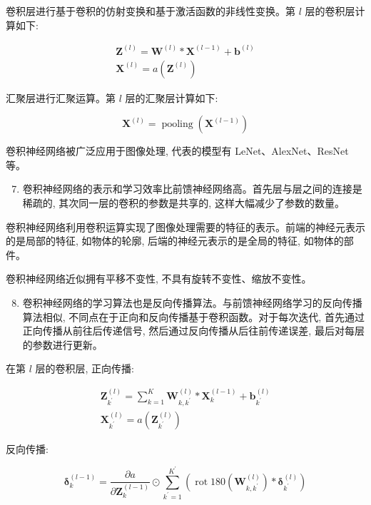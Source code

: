 \documentclass[10pt]{article}
\begin{document}
卷积层进行基于卷积的仿射变换和基于激活函数的非线性变换。第 $l$ 层的卷积层计算如下:

$$
\begin{gathered}
\boldsymbol{Z}^{(l)}=\boldsymbol{W}^{(l)} * \boldsymbol{X}^{(l-1)}+\boldsymbol{b}^{(l)} \\
\boldsymbol{X}^{(l)}=a\left(\boldsymbol{Z}^{(l)}\right)
\end{gathered}
$$

汇聚层进行汇聚运算。第 $l$ 层的汇聚层计算如下:

$$
\boldsymbol{X}^{(l)}=\operatorname{pooling}\left(\boldsymbol{X}^{(l-1)}\right)
$$

卷积神经网络被广泛应用于图像处理, 代表的模型有 LeNet、AlexNet、ResNet 等。

\begin{enumerate}
  \setcounter{enumi}{6}
  \item 卷积神经网络的表示和学习效率比前馈神经网络高。首先层与层之间的连接是稀疏的, 其次同一层的卷积的参数是共享的, 这样大幅减少了参数的数量。
\end{enumerate}

卷积神经网络利用卷积运算实现了图像处理需要的特征的表示。前端的神经元表示的是局部的特征, 如物体的轮廓, 后端的神经元表示的是全局的特征, 如物体的部件。

卷积神经网络近似拥有平移不变性, 不具有旋转不变性、缩放不变性。

\begin{enumerate}
  \setcounter{enumi}{7}
  \item 卷积神经网络的学习算法也是反向传播算法。与前馈神经网络学习的反向传播算法相似, 不同点在于正向和反向传播基于卷积函数。对于每次迭代, 首先通过正向传播从前往后传递信号, 然后通过反向传播从后往前传递误差, 最后对每层的参数进行更新。
\end{enumerate}

在第 $l$ 层的卷积层, 正向传播:

$$
\begin{gathered}
\boldsymbol{Z}_{k^{\prime}}^{(l)}=\sum_{k=1}^{K} \boldsymbol{W}_{k, k^{\prime}}^{(l)} * \boldsymbol{X}_{k}^{(l-1)}+\boldsymbol{b}_{k^{\prime}}^{(l)} \\
\boldsymbol{X}_{k^{\prime}}^{(l)}=a\left(\boldsymbol{Z}_{k^{\prime}}^{(l)}\right)
\end{gathered}
$$

反向传播:

$$
\boldsymbol{\delta}_{k}^{(l-1)}=\frac{\partial a}{\partial \boldsymbol{Z}_{k}^{(l-1)}} \odot \sum_{k^{\prime}=1}^{K^{\prime}}\left(\operatorname{rot} 180\left(\boldsymbol{W}_{k, k^{\prime}}^{(l)}\right) * \boldsymbol{\delta}_{k^{\prime}}^{(l)}\right)
$$
\end{document}
